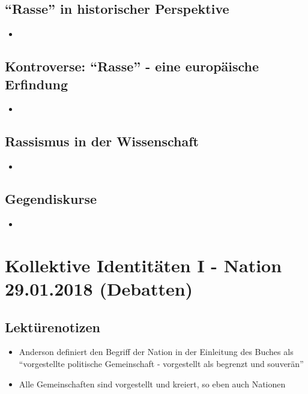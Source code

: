 \documentclass[emulatestandardclasses]{scrartcl}
\begin{document}
\subsection{"`Rasse"' in historischer Perspektive}

\begin{itemize}
  \item 
\end{itemize}

\subsection{Kontroverse: "`Rasse"' - eine europäische Erfindung}

\begin{itemize}
  \item 
\end{itemize}

\subsection{Rassismus in der Wissenschaft}

\begin{itemize}
  \item 
\end{itemize}


\subsection{Gegendiskurse}

\begin{itemize}
  \item 
\end{itemize}

\section{Kollektive Identitäten I - Nation\\29.01.2018 (Debatten)}

\subsection{Lektürenotizen}

\begin{itemize}
  \item Anderson definiert den Begriff der Nation in der Einleitung des Buches als "`vorgestellte politische Gemeinschaft - vorgestellt als begrenzt und souverän"'
  \item Alle Gemeinschaften sind vorgestellt und kreiert, so eben auch Nationen
\end{itemize}


\newpage
\end{document}
